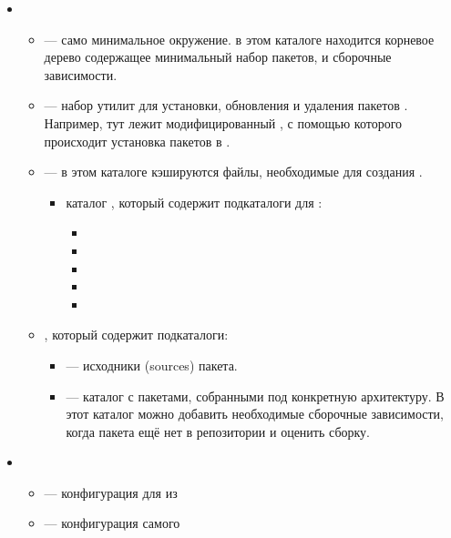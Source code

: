 \begin{itemize}
	\item {}
	
	\begin{itemize}
		\item {} --- само минимальное окружение. в этом каталоге находится корневое дерево содержащее минимальный набор пакетов,  и сборочные зависимости.
		
		\item {} --- набор утилит для установки, обновления и удаления пакетов . Например, тут лежит модифицированный , с помощью которого происходит установка пакетов в .
		
		\item {} --- в этом каталоге кэшируются файлы, необходимые для создания .
		\begin{itemize}
			\item каталог , который содержит подкаталоги для :
			\begin{itemize}
				\item {}
				\item {}
				\item {}
				\item {}
				\item {}
			\end{itemize} 
		\end{itemize}
		
		\item {}, который содержит подкаталоги:
		\begin{itemize}
			\item {} --- исходники (sources) пакета.
			\item {} --- каталог с пакетами, собранными под конкретную архитектуру.
			В этот каталог можно добавить необходимые сборочные зависимости, когда пакета ещё нет в репозитории и оценить сборку.
		\end{itemize}
	\end{itemize}
	
	\item {}
	\begin{itemize}
		\item {} --- конфигурация для  из 
		
		\item {} --- конфигурация самого 
	\end{itemize}
	

\end{itemize}
